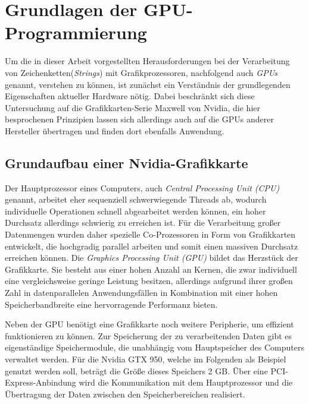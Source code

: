 \chapter{Grundlagen der GPU-Programmierung}

Um die in dieser Arbeit vorgestellten Herausforderungen bei der Verarbeitung von Zeichenketten(\emph{Strings}) mit Grafikprozessoren, nachfolgend auch \emph{GPUs} genannt, verstehen zu können, ist zunächst ein Verständnis der grundlegenden Eigenschaften aktueller Hardware nötig.
Dabei beschränkt sich diese Untersuchung auf die Grafikkarten-Serie Maxwell von Nvidia, die hier besprochenen Prinzipien lassen sich allerdings auch auf die GPUs anderer Hersteller übertragen und finden dort ebenfalls Anwendung.

\section{Grundaufbau einer Nvidia-Grafikkarte}

Der Hauptprozessor eines Computers, auch \emph{Central Processing Unit (CPU)} genannt, arbeitet eher sequenziell schwerwiegende Threads ab, wodurch individuelle Operationen schnell abgearbeitet werden können, ein hoher Durchsatz allerdings schwierig zu erreichen ist.
Für die Verarbeitung großer Datenmengen wurden daher spezielle Co-Prozessoren in Form von Grafikkarten entwickelt, die hochgradig parallel arbeiten und somit einen massiven Durchsatz erreichen können.
Die \emph{Graphics Processing Unit (GPU)} bildet das Herzstück der Grafikkarte.
Sie besteht aus einer hohen Anzahl an Kernen, die zwar individuell eine vergleichsweise geringe Leistung besitzen, allerdings aufgrund ihrer großen Zahl in datenparallelen Anwendungsfällen in Kombination mit einer hohen Speicherbandbreite eine hervorragende Performanz bieten.

Neben der GPU benötigt eine Grafikkarte noch weitere Peripherie, um effizient funktionieren zu können.
Zur Speicherung der zu verarbeitenden Daten gibt es eigenständige Speichermodule, die unabhängig vom Hauptspeicher des Computers verwaltet werden.
Für die Nvidia GTX 950, welche im Folgenden als Beispiel genutzt werden soll, beträgt die Größe dieses Speichers 2 GB.
Über eine PCI-Express-Anbindung wird die Kommunikation mit dem Hauptprozessor und die Übertragung der Daten zwischen den Speicherbereichen realisiert.

